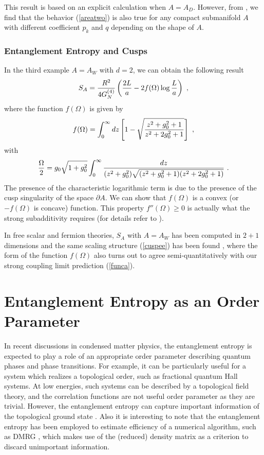 \documentclass[12pt]{article}
\def\frac#1#2{{#1\over #2}}
\def\s{\sqrt}
\def\de{\partial}
\def\f {\frac}
\def\frac#1#2{{#1\over #2}}
\def\s{\sqrt}
\def\be{\begin{equation}}
\def\ee{\end{equation}}
\begin{document}
This result is based on an explicit calculation when $A=A_D$.
However, from
\cite{GrWi},
we find that the behavior
(\ref{areatwo}) is also true for any compact submanifold $A$ with
different coefficient $p_k$ and $q$ depending on the shape of $A$.

\subsubsection{Entanglement Entropy and Cusps}
\label{EE for cusps}
In the third example $A=A_W$ with $d=2$, we can obtain the following result \cite{Hirata:2006jx}
\be
S_A=\f{R^2}{4G^{(4)}_N}
\left(\f{2L}{a}-2f(\Omega)\log\f{L}{a}\right)\ ,\label{cuspee}
\ee
where the function $f(\Omega)$ is given by
\be
f(\Omega)=\int^{\infty}_0
dz\left[1-\s{\f{z^2+g_0^2+1}{z^2+2g_0^2+1}}\right]\ ,\label{funca}
\ee
with
\be
\f{\Omega}{2}=g_0\s{1+g_0^2}\int^\infty_0\f{dz}{(z^2+g_0^2)\s{(z^2+g_0^2+1)(z^2+2g_0^2+1)}}\
.
\ee
The presence of the characteristic logarithmic term is due to the presence of the cusp singularity
of the space $\de A$. We can show that
$f(\Omega)$ is a convex (or $-f(\Omega)$ is concave) function. This property $f''(\Omega)\geq 0$
is actually what the strong subadditivity requires (for details refer to \cite{Hirata:2006jx}).

In free scalar and fermion theories, $S_A$ with $A=A_W$ has been computed in $2+1$ dimensions
and the same scaling structure (\ref{cuspee}) has been found \cite{Casini:2006hu,Casini:2008as}, where
the form of the function $f(\Omega)$ also turns out to agree semi-quantitatively with our strong coupling
limit prediction (\ref{funca}).







\section{Entanglement Entropy as an Order Parameter}
\setcounter{equation}{0}
\label{secpha}
\hspace{5mm}

In recent discussions in condensed matter physics,
the entanglement entropy is expected to play
a role of an appropriate order parameter
describing quantum phases and phase transitions.
For example,
it can be particularly useful for
a system which realizes a topological order,
such as fractional quantum Hall systems.
At low energies,
such systems can be described by a topological field theory,
and the correlation functions are not useful order parameter
as they are trivial.
However, the entanglement entropy can capture
important information of the topological
ground state \cite{Levin05,Kitaev05}.
Also it is interesting to note that the entanglement entropy
has been employed to estimate
efficiency of a numerical algorithm, such as DMRG \cite{DMRG},
which makes use of the (reduced) density matrix
as a criterion to discard unimportant information.
\end{document}
